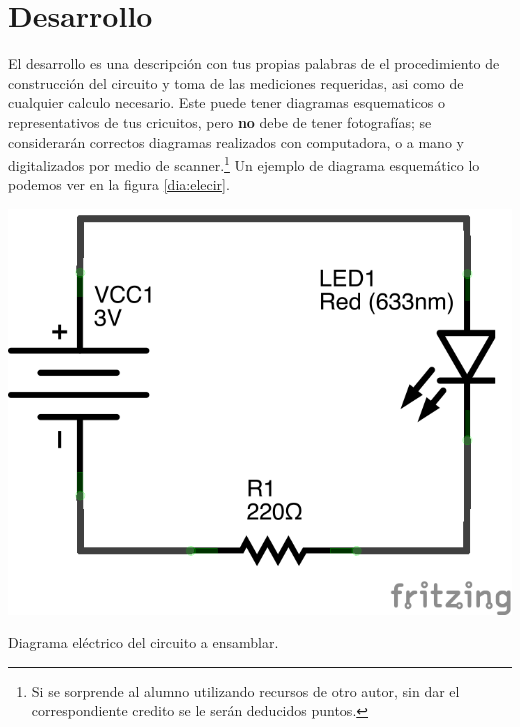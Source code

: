 
\section{Desarrollo}

    El desarrollo es una descripción con tus propias palabras de el procedimiento de construcción del circuito y toma de las mediciones requeridas, asi como de cualquier calculo necesario. Este puede tener diagramas esquematicos o representativos de tus cricuitos, pero \textbf{no} debe de tener fotografías; se considerarán correctos diagramas realizados con computadora, o a mano y digitalizados por medio de scanner.\footnote{Si se sorprende al alumno utilizando recursos de otro autor, sin dar el correspondiente credito se le serán deducidos puntos.} Un ejemplo de diagrama esquemático lo podemos ver en la figura \ref{dia:elecir}. \\

    \begin{marginfigure}%
    	\begin{center}
    		\includegraphics[width=\textwidth]{images/LED-bateria-diagrama.png}
    		\caption{Diagrama eléctrico del circuito a ensamblar.}
    		\label{dia:elecir}
    	\end{center}
    \end{marginfigure}

